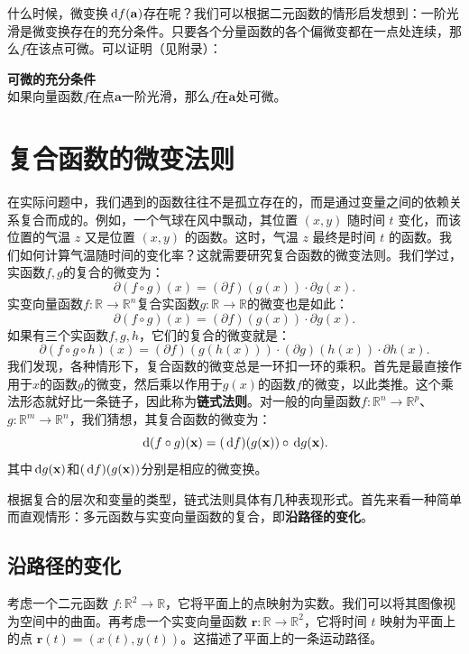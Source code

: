 \documentclass[12pt,UTF8,fontset=none]{ctexbook}
\begin{document}
什么时候，微变换$\,\mathrm{d} f (\mathbf{a})$存在呢？我们可以根据二元函数的情形启发想到：一阶光滑是微变换存在的充分条件。只要各个分量函数的各个偏微变都在一点处连续，那么$f$在该点可微。可以证明（见附录）：
\begin{tm}{\textbf{可微的充分条件}}\\
如果向量函数$f$在点$\mathbf{a}$一阶光滑，那么$f$在$\mathbf{a}$处可微。
\end{tm}

\section{复合函数的微变法则}

在实际问题中，我们遇到的函数往往不是孤立存在的，而是通过变量之间的依赖关系复合而成的。例如，一个气球在风中飘动，其位置 $(x, y)$ 随时间 $t$ 变化，而该位置的气温 $z$ 又是位置 $(x, y)$ 的函数。这时，气温 $z$ 最终是时间 $t$ 的函数。我们如何计算气温随时间的变化率？这就需要研究复合函数的微变法则。我们学过，实函数$f,g$的复合的微变为：
$$ \partial (f\circ g)(x) = (\partial f)(g(x)) \cdot \partial g(x). $$
实变向量函数$f:\mathbb{R}\rightarrow\mathbb{R}^n$复合实函数$g:\mathbb{R}\rightarrow\mathbb{R}$的微变也是如此：
$$ \partial (f \circ g) (x) = (\partial f)(g(x))\cdot \partial g(x). $$
如果有三个实函数$f,g,h$，它们的复合的微变就是：
$$ \partial (f \circ g\circ h) (x) = (\partial f)(g(h(x)))\cdot (\partial g)(h(x))\cdot \partial h(x). $$
我们发现，各种情形下，复合函数的微变总是一环扣一环的乘积。首先是最直接作用于$x$的函数$g$的微变，然后乘以作用于$g(x)$的函数$f$的微变，以此类推。这个乘法形态就好比一条链子，因此称为\textbf{链式法则}。对一般的向量函数$f:\mathbb{R}^n\rightarrow\mathbb{R}^p$、$g:\mathbb{R}^m\rightarrow\mathbb{R}^n$，我们猜想，其复合函数的微变为：
$$ \,\mathrm{d} (f \circ g) (\mathbf{x}) = (\,\mathrm{d} f)(g(\mathbf{x}))\circ \,\mathrm{d} g(\mathbf{x}). $$
其中$\,\mathrm{d} g(\mathbf{x})$和$(\,\mathrm{d} f)(g(\mathbf{x}))$分别是相应的微变换。

根据复合的层次和变量的类型，链式法则具体有几种表现形式。首先来看一种简单而直观情形：多元函数与实变向量函数的复合，即\textbf{沿路径的变化}。

\subsection{沿路径的变化}

考虑一个二元函数 $f: \mathbb{R}^2 \to \mathbb{R}$，它将平面上的点映射为实数。我们可以将其图像视为空间中的曲面。再考虑一个实变向量函数 $\mathbf{r}: \mathbb{R} \to \mathbb{R}^2$，它将时间 $t$ 映射为平面上的点 $\mathbf{r}(t) = (x(t), y(t))$。这描述了平面上的一条运动路径。
\end{document}

